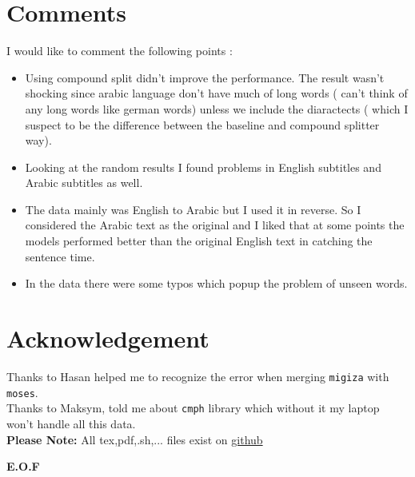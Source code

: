 \documentclass{article}
\begin{document}
\section{Comments}
I would like to comment the following points :
\begin{itemize}
\item Using compound split didn't improve the performance. The result wasn't shocking since arabic language don't have much of long words ( can't think of any long words like german words) unless we include the diaractects ( which I suspect to be the difference between the baseline and compound splitter way).
\item Looking at the random results I found problems in English subtitles and Arabic subtitles as well.
\item The data mainly was English to Arabic but I used it in reverse. So I considered the Arabic text as the original and I liked that at some points the models performed better than the original English text in catching the sentence time.
\item In the data there were some typos which popup the problem of unseen words.
\end{itemize}
\section{Acknowledgement}
Thanks to Hasan helped me to recognize the error when merging \texttt{migiza} with \texttt{moses}.\\
Thanks to Maksym, told me about \texttt{cmph} library which without it my laptop won't handle all this data.\\
\textbf{Please Note:} All tex,pdf,.sh,... files exist on \href{https://github.com/aqeel13932/MT/tree/master/03PreProcessing}{github}

{\center \textbf{E.O.F\\}}
\end{document}
